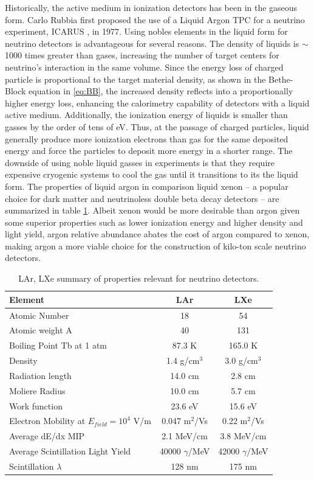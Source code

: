 Historically, the active medium in ionization detectors has been in the gaseous form. Carlo Rubbia first proposed the use of a Liquid Argon TPC for a neutrino experiment, ICARUS \cite{Rubbia:1977zz}, in 1977.  Using nobles elements in the liquid form for neutrino detectors is advantageous for several reasons.  The density of liquids is $\sim$1000 times greater than gases, increasing the number of target centers for neutrino's interaction in the same volume. Since the energy loss of charged particle is proportional to the target material density, as shown in the Bethe-Block equation in \ref{eq:BB}, the increased density reflects into a proportionally higher energy loss, enhancing the calorimetry capability of detectors with a liquid active medium. Additionally, the ionization energy of liquids is smaller than gasses by the order of tens of eV. Thus, at the passage of charged particles, liquid generally produce more ionization electrons than gas for the same deposited energy and force the particles to deposit more energy in a shorter range. The downside of using noble liquid gasses in experiments is that they require expensive cryogenic systems to cool the gas until it transitions to its the liquid form.
The properties of liquid argon in comparison liquid xenon -- a popular choice for dark matter and neutrinoless double beta decay detectors -- are summarized in table \ref{tab:properties}.  Albeit xenon would be more desirable than argon given some superior properties such as lower ionization energy and higher density and light yield, argon relative abundance abates the cost of argon compared to xenon, making argon a more viable choice for the construction of kilo-ton scale neutrino detectors. 




\begin{table}[]
\centering
\begin{tabular}{|l|c|c|}\hline
Element & LAr & LXe \\
\hline
\hline
Atomic Number &  18 &54 \\
Atomic weight A & 40  & 131\\
Boiling Point Tb at 1 atm & 87.3 K & 165.0 K\\
Density  & 1.4 g/cm$^3$& 3.0 g/cm$^3$\\
Radiation length  & 14.0 cm& 2.8 cm \\
Moliere Radius  &10.0 cm& 5.7 cm\\
Work function  & 23.6 eV&15.6 eV\\
Electron Mobility at $E_{field} =10^4$ V/m &0.047 m$^2$/Vs& 0.22 m$^2$/Vs\\
Average dE/dx MIP  & 2.1 MeV/cm&3.8 MeV/cm\\
Average Scintillation Light Yield & 40000 $\gamma$/MeV&42000 $\gamma$/MeV\\
Scintillation $\lambda$  &128 nm&175 nm\\
\hline
\end{tabular}
\caption{LAr, LXe summary of properties relevant for neutrino detectors.}
\label{tab:properties}
\end{table}


